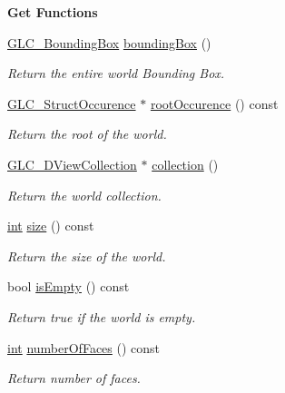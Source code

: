 \begin{Indent}{\bf Get Functions}\par
\begin{DoxyCompactItemize}
\item 
\hyperlink{class_g_l_c___bounding_box}{G\-L\-C\-\_\-\-Bounding\-Box} \hyperlink{class_g_l_c___world_a2512d62b25464fb90054cb338bc474aa}{bounding\-Box} ()
\begin{DoxyCompactList}\small\item\em Return the entire world Bounding Box. \end{DoxyCompactList}\item 
\hyperlink{class_g_l_c___struct_occurence}{G\-L\-C\-\_\-\-Struct\-Occurence} $\ast$ \hyperlink{class_g_l_c___world_a0ca81ec879cd023877a3f126f44e4389}{root\-Occurence} () const 
\begin{DoxyCompactList}\small\item\em Return the root of the world. \end{DoxyCompactList}\item 
\hyperlink{class_g_l_c__3_d_view_collection}{G\-L\-C\-\_\-D\-View\-Collection} $\ast$ \hyperlink{class_g_l_c___world_a6a211d1f53d86cb7aba21165781886fc}{collection} ()
\begin{DoxyCompactList}\small\item\em Return the world collection. \end{DoxyCompactList}\item 
\hyperlink{ioapi_8h_a787fa3cf048117ba7123753c1e74fcd6}{int} \hyperlink{class_g_l_c___world_a94549f0b6407951cf6ef330d746bda65}{size} () const 
\begin{DoxyCompactList}\small\item\em Return the size of the world. \end{DoxyCompactList}\item 
bool \hyperlink{class_g_l_c___world_a7cad696003cae9c17ae5b246e18facf9}{is\-Empty} () const 
\begin{DoxyCompactList}\small\item\em Return true if the world is empty. \end{DoxyCompactList}\item 
\hyperlink{ioapi_8h_a787fa3cf048117ba7123753c1e74fcd6}{int} \hyperlink{class_g_l_c___world_a305774b9ed17a83ba36a6a78115b4f3e}{number\-Of\-Faces} () const 
\begin{DoxyCompactList}\small\item\em Return number of faces. \end{DoxyCompactList}\item 

\end{DoxyCompactItemize}
\end{Indent}

